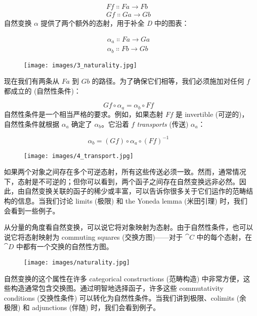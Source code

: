 \begin{gather*}
  F f \Colon F a \to F b \\
  G f \Colon G a \to G b
\end{gather*}
自然变换 $\alpha$ 提供了两个额外的态射，用于补全 \emph{D} 中的图表：

\begin{gather*}
  \alpha_a \Colon F a \to G a \\
  \alpha_b \Colon F b \to G b
\end{gather*}

\begin{figure}[H]
  \centering
  \texttt{[image: images/3\_naturality.jpg]}
\end{figure}

\noindent
现在我们有两条从 $F a$ 到 $G b$ 的路径。为了确保它们相等，我们必须施加对任何 $f$ 都成立的  (自然性条件)：

\[G f \circ \alpha_a = \alpha_b \circ F f\]
自然性条件是一个相当严格的要求。例如，如果态射 $F f$ 是 invertible (可逆的)，自然性条件就根据 $\alpha_a$ 确定了 $\alpha_b$。它沿着 $f$ \emph{transports} (传送) $\alpha_a$：

\[\alpha_b = (G f) \circ \alpha_a \circ (F f)^{-1}\]

\begin{figure}[H]
  \centering
  \texttt{[image: images/4\_transport.jpg]}
\end{figure}

\noindent
如果两个对象之间存在多个可逆态射，所有这些传送必须一致。然而，通常情况下，态射是不可逆的；但你可以看到，两个函子之间存在自然变换远非必然。因此，由自然变换关联的函子的稀少或丰富，可以告诉你很多关于它们运作的范畴结构的信息。当我们讨论 limits (极限) 和 the Yoneda lemma (米田引理) 时，我们会看到一些例子。

从分量的角度看自然变换，可以说它将对象映射为态射。由于自然性条件，也可以说它将态射映射为 commuting squares (交换方图)——对于 $\cat{C}$ 中的每个态射，在 $\cat{D}$ 中都有一个交换的自然性方图。

\begin{figure}[H]
  \centering
  \texttt{[image: images/naturality.jpg]}
\end{figure}

\noindent
自然变换的这个属性在许多 categorical constructions (范畴构造) 中非常方便，这些构造通常包含交换图。通过明智地选择函子，许多这些 commutativity conditions (交换性条件) 可以转化为自然性条件。当我们讲到极限、colimits (余极限) 和 adjunctions (伴随) 时，我们会看到例子。

